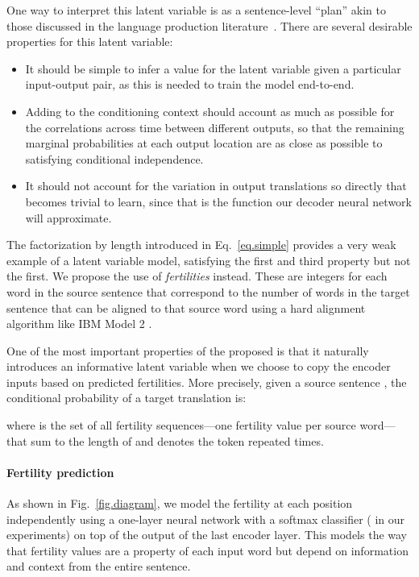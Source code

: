 \documentclass{article} \usepackage{iclr2018_conference,times}
\begin{document}
One way to interpret this latent variable is as a sentence-level ``plan'' akin to those discussed in the language production literature~\citep{martin2010planning}. There are several desirable properties for this latent variable:
\begin{itemize}[leftmargin=*]
\item It should be simple to infer a value for the latent variable given a particular input-output pair, as this is needed to train the model end-to-end.
\item Adding  to the conditioning context should account as much as possible for the correlations across time between different outputs, so that the remaining marginal probabilities at each output location are as close as possible to satisfying conditional independence.
\item It should not account for the variation in output translations so directly that  becomes trivial to learn, since that is the function our decoder neural network will approximate.
\end{itemize}
The factorization by length introduced in Eq.~\ref{eq.simple} provides a very weak example of a latent variable model, satisfying the first and third property but not the first. We propose the use of \emph{fertilities} instead. These are integers for each word in the source sentence that correspond to the number of words in the target sentence that can be aligned to that source word using a hard alignment algorithm like IBM Model 2 \citep{brown1993mathematics}.



One of the most important properties of the proposed \model{} is that it naturally introduces an informative latent variable when we choose to copy the encoder inputs based on predicted fertilities.  More precisely, given a source sentence , the conditional probability of a target translation  is:

where  is the set of all fertility sequences---one fertility value per source word---that sum to the length of  and  denotes the token  repeated  times.

\vspace{-5pt}
\paragraph{Fertility prediction} As shown in Fig.~\ref{fig.diagram}, we model the fertility  at each position independently using a one-layer neural network with a softmax classifier ( in our experiments) on top of the output of the last encoder layer. This models the way that fertility values are a property of each input word but depend on information and context from the entire sentence.
\end{document}
